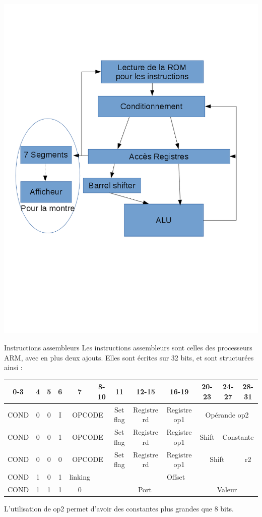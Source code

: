 \documentclass[11pt]{beamer}
\begin{document}
\begin{frame}
    \includegraphics[scale=0.4]{test.png}
\end{frame}

\begin{frame}{Instructions assembleurs}
  Les instructions assembleurs sont celles des processeurs ARM, avec en plus
  deux ajouts. Elles sont écrites sur 32 bits, et sont structurées ainsi :
  {\tiny
  \begin{tabular}{|c|c|c|c|c|c|c|c|c|c|c|c|}
  \hline
  0-3  & 4 & 5 & 6 & 7 & 8-10 & 11 & 12-15 & 16-19 & 20-23 & 24-27 & 28-31 \\
  \hline
  COND & 0 & 0 & I & \multicolumn{2}{c|}{OPCODE} & Set flag & Registre rd & Registre op1 & \multicolumn{3}{c|}{Opérande op2}  \\
  \hline
  COND & 0 & 0 & 1 & \multicolumn{2}{c|}{OPCODE} & Set flag & Registre rd &Registre op1 & Shift & \multicolumn{2}{c|}{Constante} \\
  \hline
  COND & 0 & 0 & 0 & \multicolumn{2}{c|}{OPCODE} & Set flag & Registre rd & Registre op1 & \multicolumn{2}{c|}{Shift} & r2  \\
  \hline
  COND & 1 & 0 & 1 & linking & \multicolumn{ 7}{c|}{Offset} \\
  \hline
  COND & 1 & 1 & 1 & 0 & \multicolumn{4}{c|}{Port} & \multicolumn{3}{c|}{Valeur} \\
  \hline
  \end{tabular}}
L'utilisation de op2 permet d'avoir des constantes plus grandes que 8 bits.
\end{frame}
\end{document}
